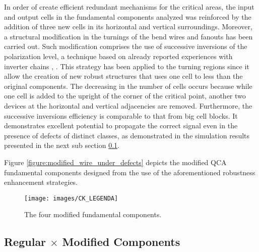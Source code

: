In order of create efficient redundant mechanisms for the critical areas, the input and output cells in the fundamental components analyzed was reinforced by the addition of three new cells in its horizontal and vertical surroundings. Moreover, a structural modification in the turnings of the bend wires and fanouts has been carried out. Such modification comprises the use of successive inversions of the polarization level, a technique based on already reported experiences with inverter chains \cite{gupta07}, \cite{padgett10}. This strategy has been applied to the turning regions since it allow the creation of new robust structures that uses one cell to less than the original components. The decreasing in the number of cells occurs because while one cell is added to the upright of the corner of the critical point, another two devices at the horizontal and vertical adjacencies are removed. Furthermore, the successive inversions efficiency is comparable to that from big cell blocks. It demonstrates excellent potential to propagate the correct signal even in the presence of defects of distinct classes, as demonstrated in the simulation results presented in the next sub section \ref{subsection:Comparison_Between_Robustness_Levels}.

Figure \ref{figure:modified_wire_under_defects} depicts the modified QCA fundamental components designed from the use of the aforementioned robustness enhancement strategies.

\begin{figure}[!ht]
\center
{}
\hfill
{}
\linebreak
{}
\hfill
{}
\linebreak
{\texttt{[image: images/CK\_LEGENDA]}
}
\caption{The four modified fundamental components.}
\label{figure:modified_fundamental_components}
\end{figure}

\subsection{Regular $\times$ Modified Components}
\label{subsection:Comparison_Between_Robustness_Levels}

